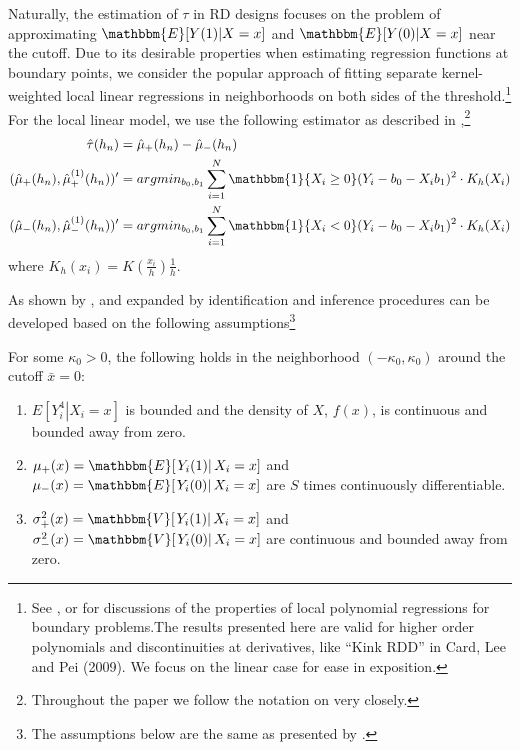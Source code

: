 \documentclass[12pt,fleqn]{article}
\begin{document}
Naturally, the estimation of $\tau$ in RD designs focuses on the 
problem of approximating $\mathbbm{E}[Y(1)|X=x]$ and $\mathbbm{E}[Y(0)|X=x]$ 
near the cutoff. Due to its desirable properties when estimating regression 
functions at boundary points, we consider the popular approach of fitting 
separate kernel-weighted local linear regressions in neighborhoods on both 
sides of the threshold.\footnote{See \cite{HTV2001}, \cite{Porter03} or
\cite{FanGijbels92} for discussions of the properties of local polynomial 
regressions for boundary problems.The results presented here are valid for
higher order polynomials and discontinuities at derivatives, like ``Kink RDD''
in Card, Lee and Pei (2009). We focus on the linear case for ease in exposition.}
For the local linear model, we use the following estimator as described in 
\cite{calonico2014},\footnote{Throughout the paper we follow the
notation on \cite{calonico2014} very closely.}
\begin{align*}
 \hat{\tau}(h_{n})&=\hat {\mu}_{+}(h_{n}) -\hat{\mu}_{-}(h_{n})\\
(\hat {\mu}_{+}(h_{n}),\hat {\mu}^{(1)}_{+}(h_{n}))'&= argmin_{b_{0},b_{1}} 
\sum_{i=1}^{N}\mathbbm{1}\{X_{i} \geq 0\}(Y_{i}-b_{0}-X_{i}b_{1})^{2} \cdot K_{h}(X_{i})\\
(\hat {\mu}_{-}(h_{n}),\hat {\mu}^{(1)}_{-}(h_{n}))' &= argmin_{b_{0},b_{1}}
\sum_{i=1}^{N}\mathbbm{1}\{X_{i} < 0\}(Y_{i}-b_{0}-X_{i}b_{1})^{2}\cdot K_{h}(X_{i})
\end{align*}
where $K_{h}(x_{i}) = K\left(\frac{x_{i}}{h}\right)\frac{1}{h}$.

As shown by \cite{HTV2001}, \cite{Porter03} and expanded by \cite{calonico2014} 
identification and inference procedures can be developed based on the following 
assumptions\footnote{The assumptions below are the same as presented by \cite{calonico2014}.}
\begin{assumption}\label{A1}
 For some $\kappa_{0} > 0$, the following holds in the neighborhood 
 $(-\kappa_{0},\kappa_{0})$ around the cutoff $ \bar{x}= 0$:
 \begin{enumerate}
  \item $E[\left.Y_{i}^{4}\right|X_{i}=x]$ is bounded and the density of $X$, 
  $f(x)$, is continuous and bounded away from zero.
  \item $\mu_{+}(x)=\mathbbm{E}[\left.Y_{i}(1)\right|X_{i}=x]$ and $\mu_{-}(x)=
  \mathbbm{E}[\left.Y_{i}(0)\right|X_{i}=x]$ are $S$ times continuously 
  differentiable.
  \item $\sigma^{2}_{+}(x)=\mathbbm{V}[\left.Y_{i}(1)\right|X_{i}=x]$ and 
  $\sigma^{2}_{-}(x)=\mathbbm{V}[\left.Y_{i}(0)\right|X_{i}=x]$ are continuous 
  and bounded away from zero.
 \end{enumerate}
\end{assumption}
\end{document}
